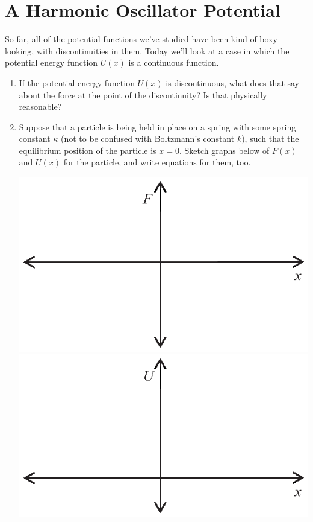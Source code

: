 \section{A Harmonic Oscillator Potential}

\makelabheader %

\bigskip

So far, all of the potential functions we've studied have been kind of boxy-looking, with discontinuities in them.  Today we'll look at a case in which the potential energy function $U(x)$ is a continuous function.  

\begin{enumerate}[wide]

\item If the potential energy function $U(x)$ is discontinuous, what does that say about the force at the point of the discontinuity?  Is that physically reasonable?
\answerspace{0.6in}

\item Suppose that a particle is being held in place on a spring with some spring constant $\kappa$  (not to be confused with Boltzmann's constant $k$), such that the equilibrium position of the particle is $x=0$.  Sketch graphs below of $F(x)$ and $U(x)$ for the particle, and write equations for them, too.
\begin{center}
\includegraphics{harmonic_oscillator/F_axes.eps}
\includegraphics{harmonic_oscillator/U_axes.eps}
\end{center}
\bigskip


\end{enumerate}
